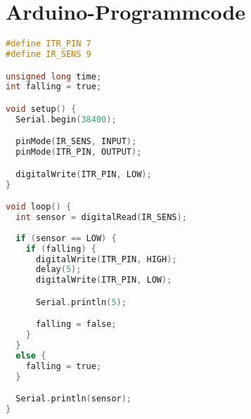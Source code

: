 
\addchap{\appendixPhrase}

\section{Arduino-Programmcode}
\begin{lstlisting}[language=C, label={lst:arduino_selfmade_interrupts}, caption=Programm-Code zur Erstellung des Self-Made Interrupts]
#define ITR_PIN 7
#define IR_SENS 9

unsigned long time;
int falling = true;

void setup() {
  Serial.begin(38400);

  pinMode(IR_SENS, INPUT);
  pinMode(ITR_PIN, OUTPUT);

  digitalWrite(ITR_PIN, LOW);
}

void loop() {
  int sensor = digitalRead(IR_SENS);
  
  if (sensor == LOW) {
    if (falling) {
      digitalWrite(ITR_PIN, HIGH);
      delay(5);
      digitalWrite(ITR_PIN, LOW);

      Serial.println(5);

      falling = false;
    }
  }
  else {
    falling = true;
  }

  Serial.println(sensor);
}
\end{lstlisting}

